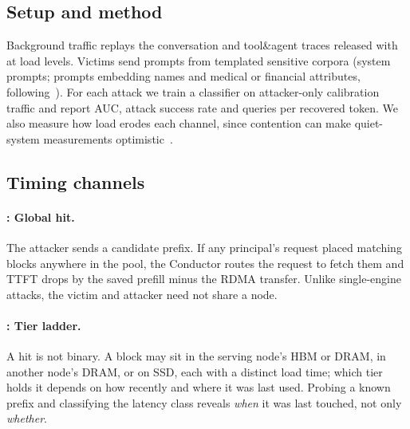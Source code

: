 \subsection{Setup and method}
\label{sec:attack-method}
Background traffic replays the conversation and tool\&agent traces released
with \mc~\cite{qin2025mooncake} at  load levels. Victims send prompts
from templated sensitive corpora (system prompts; prompts embedding names and
medical or financial attributes, following~\cite{chu2025safekv,pennas2026cachesolidarity}).
For each attack we train a classifier on attacker-only calibration traffic and
report AUC, attack success rate and queries per recovered token. We also measure
how load erodes each channel, since contention can make quiet-system
measurements optimistic~\cite{abubakar2026contention}.

\subsection{Timing channels}

\paragraph{: Global hit.} The attacker sends a candidate prefix. If any
principal's request placed matching blocks anywhere in the pool, the Conductor
routes the request to fetch them and TTFT drops by the saved prefill minus the
RDMA transfer. Unlike single-engine attacks, the victim and attacker need not
share a node. 

\paragraph{: Tier ladder.} A hit is not binary. A block may sit in the
serving node's HBM or DRAM, in another node's DRAM, or on SSD, each with a
distinct load time; which tier holds it depends on how recently and where it
was last used. Probing a known prefix and classifying the latency class reveals
\emph{when} it was last touched, not only \emph{whether}. 

